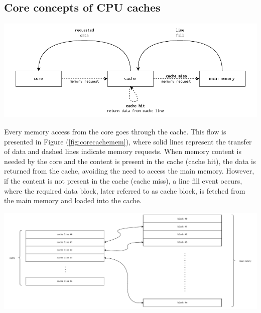 \subsection{Core concepts of CPU caches}

\begin{center}
	\centering
	\includegraphics[width=\textwidth]{figures/02-background/caches-cpu-cache-memory.pdf}
	\label{fig:corecachemem}
\end{center}
\vspace{5px}

\noindent Every memory access from the core goes through the cache. This flow is presented in Figure (\ref{fig:corecachemem}), where solid lines represent the transfer of data and
dashed lines indicate memory requests. When memory content is needed by the core and the content is present in the cache (cache hit), the data is returned from the cache, avoiding
the need to access the main memory. However, if the content is not present in the cache (cache miss), a line fill event occurs, where the required data block, later referred to as
cache block, is fetched from the main memory and loaded into the cache.


\begin{center}
	\centering
	\includegraphics[width=\textwidth]{figures/02-background/caches-cacheline_to_memory.pdf}
\end{center}


